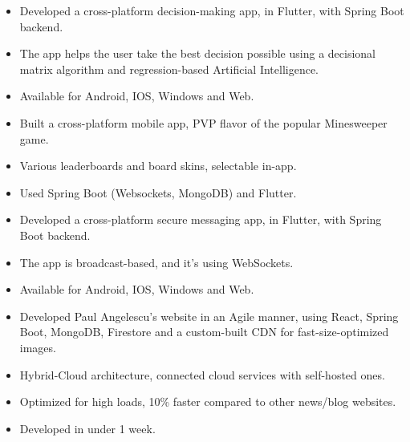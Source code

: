 \documentclass[10pt,a4paper,ragged2e]{resume}
\begin{document}
    \begin{fullwidth}
        \begin{itemize}
            \item Developed a cross-platform decision-making app, in Flutter, with Spring Boot backend.
            \item The app helps the user take the best decision possible using a decisional matrix algorithm and regression-based Artificial Intelligence.
            \item Available for Android, IOS, Windows and Web.
        \end{itemize}
        \divider

        \begin{itemize}
            \item Built a cross-platform mobile app, PVP flavor of the popular Minesweeper game.
            \item Various leaderboards and board skins, selectable in-app.
            \item Used Spring Boot (Websockets, MongoDB) and Flutter.
        \end{itemize}
        \divider

        \begin{itemize}
            \item Developed a cross-platform secure messaging app, in Flutter, with Spring Boot backend.
            \item The app is broadcast-based, and it's using WebSockets.
            \item Available for Android, IOS, Windows and Web.
        \end{itemize}
        \divider

        \begin{itemize}
            \item Developed Paul Angelescu's website in an Agile manner, using React, Spring Boot, MongoDB, Firestore and a custom-built CDN for fast-size-optimized images.
            \item Hybrid-Cloud architecture, connected cloud services with self-hosted ones.
            \item Optimized for high loads, 10\% faster compared to other news/blog websites.
            \item Developed in under 1 week.
        \end{itemize}
        \divider


\end{fullwidth}
\end{document}
